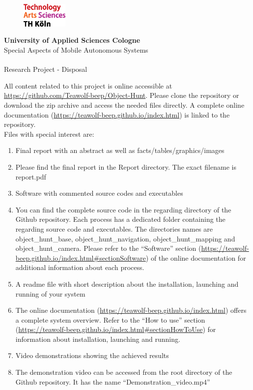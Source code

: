 \documentclass[a4paper,11pt,oneside]{article}
\begin{document}
  \pagestyle{fancy} %
  \fancyhead{}
  \fancyhf{}
  \renewcommand{\headrulewidth}{0pt}
  \renewcommand{\footrulewidth}{0.4pt}
  \fancyfoot[R] {}
  \begin{figure}
    \includegraphics[width=0.2\textwidth]{sources/logo_TH-Koeln_CMYK_22pt}
  \end{figure}
  \Large
  \textbf{University of Applied Sciences Cologne}\\
  Special Aspects of Mobile Autonomous Systems\\
  \\
  \large
  Research Project - Disposal\\

\vspace{5mm}

All content related to this project is online accessible at \url{https://github.com/Teawolf-beep/Object-Hunt}. Please clone the repository or download the zip archive and access the needed files directly. A complete online documentation (\url{https://teawolf-beep.github.io/index.html}) is linked to the repository.\\

Files with special interest are:

\begin{enumerate}
\item Final report with an abstract as well as facts/tables/graphics/images
\item[] Please find the final report in the Report directory. The exact filename is report.pdf
\item Software with commented source codes and executables
\item[] You can find the complete source code in the regarding directory of the Github repository. Each process has a dedicated folder containing the regarding source code and executables. The directories names are object\_hunt\_base, object\_hunt\_navigation, object\_hunt\_mapping and object\_hunt\_camera. Please refer to the ``Software'' section (\url{https://teawolf-beep.github.io/index.html#sectionSoftware}) of the online documentation for additional information about each process.
\item A readme file with short description about the installation, launching and running of your system
\item[] The online documentation (\url{https://teawolf-beep.github.io/index.html}) offers a complete system overview. Refer to the ``How to use'' section (\url{https://teawolf-beep.github.io/index.html#sectionHowToUse}) for information about installation, launching and running.
\item Video demonstrations showing the achieved results
\item[] The demonstration video can be accessed from the root directory of the Github repository. It has the name ``Demonstration\_video.mp4''
\end{enumerate}
  
\end{document}

